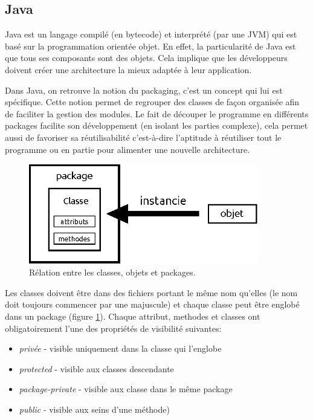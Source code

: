 \documentclass[10pt]{article}
\begin{document}
\subsection{Java}
Java est un langage compilé (en bytecode) et interprété (par une JVM) qui est basé sur la programmation orientée objet. En effet, la particularité de Java est que tous ses composants sont des objets. Cela implique que les développeurs doivent créer une architecture la mieux adaptée à leur application.

Dans Java, on retrouve la notion du  packaging, c'est un concept qui lui est spécifique. Cette notion permet de regrouper des classes de façon organisée afin de faciliter la gestion des modules. Le fait de découper le programme en différents packages facilite son développement (en isolant les parties complexe), cela permet aussi de favoriser sa réutilisabilité c’est-à-dire l’aptitude à réutiliser tout le programme ou en partie pour alimenter une nouvelle architecture.

\begin{figure}[ht]
    \centering
    \includegraphics[width=10cm]{pics/classe.eps}
    \caption{Rélation entre les classes, objets et packages.}
    \label{fig:jvm}
\end{figure}

Les classes doivent être dans des fichiers portant le même nom qu’elles (le nom doit toujours commencer par une majuscule) et chaque classe peut être englobé dans un package (figure \ref{fig:jvm}). Chaque attribut, methodes et classes ont obligatoirement l'une des propriétés de visibilité suivantes:
\begin{itemize}
    \item \textit{privée} - visible uniquement dans la classe qui l’englobe
    \item \textit{protected} - visible aux classes descendante
    \item \textit{package-private} - visible aux classe dans le même package
    \item \textit{public} - visible aux seins d’une méthode)
\end{itemize}
\end{document}
